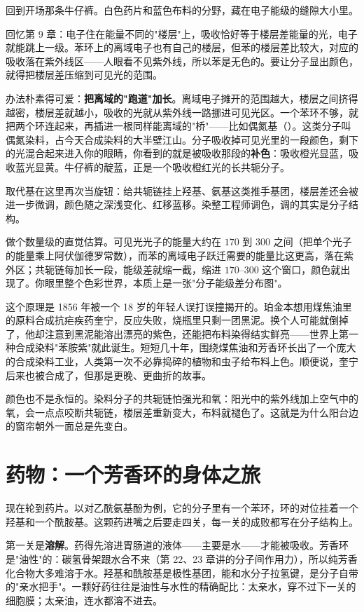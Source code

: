 回到开场那条牛仔裤。白色药片和蓝色布料的分野，藏在电子能级的缝隙大小里。

回忆第 9 章：电子住在能量不同的"楼层"上，吸收恰好等于楼层差能量的光，电子就能跳上一级。苯环上的离域电子也有自己的楼层，但苯的楼层差比较大，对应的吸收落在紫外线区——人眼看不见紫外线，所以苯是无色的。要让分子显出颜色，就得把楼层差压缩到可见光的范围。

办法朴素得可爱：\textbf{把离域的"跑道"加长}。离域电子摊开的范围越大，楼层之间挤得越密，楼层差就越小，吸收的光就从紫外线一路挪进可见光区。一个苯环不够，就把两个环连起来，再插进一根同样能离域的"桥"——比如偶氮基（）。这类分子叫偶氮染料，占今天合成染料的大半壁江山。分子吸收掉可见光里的一段颜色，剩下的光混合起来进入你的眼睛，你看到的就是被吸收那段的\textbf{补色}：吸收橙光显蓝，吸收蓝光显黄。牛仔裤的靛蓝，正是一个吸收橙红光的长共轭分子。

取代基在这里再次当旋钮：给共轭链挂上羟基、氨基这类推手基团，楼层差还会被进一步微调，颜色随之深浅变化、红移蓝移。染整工程师调色，调的其实是分子结构。

做个数量级的直觉估算。可见光光子的能量大约在 $170$ 到 $300$  之间（把单个光子的能量乘上阿伏伽德罗常数），而苯的离域电子跃迁需要的能量比这更高，落在紫外区；共轭链每加长一段，能级差就缩一截，缩进 $170$–$300$ 这个窗口，颜色就出现了。你眼里整个色彩世界，本质上是一张"分子能级差分布图"。

这个原理是 1856 年被一个 18 岁的年轻人误打误撞揭开的。珀金本想用煤焦油里的原料合成抗疟疾药奎宁，反应失败，烧瓶里只剩一团黑泥。换个人可能就倒掉了，他却注意到黑泥能溶出漂亮的紫色，还能把布料染得结实鲜亮——世界上第一种合成染料"苯胺紫"就此诞生。短短几十年，围绕煤焦油和芳香环长出了一个庞大的合成染料工业，人类第一次不必靠捣碎的植物和虫子给布料上色。顺便说，奎宁后来也被合成了，但那是更晚、更曲折的故事。

颜色也不是永恒的。染料分子的共轭链怕强光和氧：阳光中的紫外线加上空气中的氧，会一点点咬断共轭链，楼层差重新变大，布料就褪色了。这就是为什么阳台边的窗帘朝外一面总是先变白。

\section{药物：一个芳香环的身体之旅}

现在轮到药片。以对乙酰氨基酚为例，它的分子里有一个苯环，环的对位挂着一个羟基和一个酰胺基。这颗药进嘴之后要走四关，每一关的成败都写在分子结构上。

第一关是\textbf{溶解}。药得先溶进胃肠道的液体——主要是水——才能被吸收。芳香环是"油性"的：碳氢骨架跟水合不来（第 22、23 章讲的分子间作用力），所以纯芳香化合物大多难溶于水。羟基和酰胺基是极性基团，能和水分子拉氢键，是分子自带的"亲水把手"。一颗好药往往是油性与水性的精确配比：太亲水，穿不过下一关的细胞膜；太亲油，连水都溶不进去。


